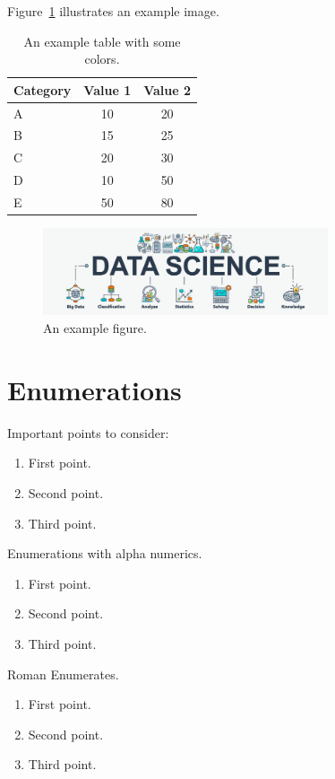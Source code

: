 Figure~\ref{fig:example} illustrates an example image.


\begin{table}[h]
	\centering
	 \setlength\arrayrulewidth{1.2pt} %
	\begin{tabular}{|l| c| c|}
		\hline
	\rowcolor{pink} 	Category & Value 1 & Value 2 \\
		\hline
		  A & 10 & 20 \\ \hline 
		 B & 15 & 25 \\ \hline 
		   C & 20 & 30 \\ 
		\hline
				   D & 10 & 50 \\ 
		\hline
				   E & 50 & 80 \\ 
		\hline
	\end{tabular}
	\caption{An example table with some colors.}
	\label{tab:example2}
\end{table}


\begin{figure}[h]
	\centering
	\includegraphics[width=0.75\textwidth]{img/data-science}
	\caption{An example figure.}
	\label{fig:example}
\end{figure}

\section{Enumerations}
Important points to consider:
\begin{enumerate}
	\item First point.
	\item Second point.
	\item Third point.
\end{enumerate}

Enumerations with alpha numerics.
\begin{enumerate}[label={(\alph*)}]
	\item First point.
	\item Second point.
	\item Third point.
\end{enumerate}


Roman Enumerates.

\begin{enumerate}[label={(\roman*)}]
	\item First point.
	\item Second point.
	\item Third point.
\end{enumerate}